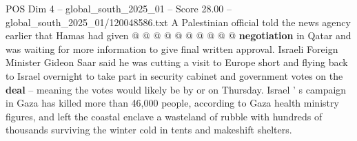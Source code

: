 \begin{textsample}{POS Dim 4 – global\_south\_2025\_01 – Score 28.00 – global\_south\_2025\_01/120048586.txt}
A Palestinian official told the news agency earlier that Hamas had given @ @ @ @ @ @ @ @ @ @ \textbf{negotiation} in Qatar and was waiting for more information to give final written approval.
Israeli Foreign Minister Gideon Saar said he was cutting a visit to Europe short and flying back to Israel overnight to take part in security cabinet and government votes on the \textbf{deal} -- meaning the votes would likely be by or on Thursday.
Israel ' s campaign in Gaza has killed more than 46,000 people, according to Gaza health ministry figures, and left the coastal enclave a wasteland of rubble with hundreds of thousands surviving the winter cold in tents and makeshift shelters.

\end{textsample}
